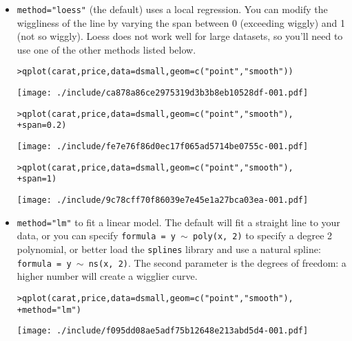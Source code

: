 \begin{itemize}
	\item {\tt method="loess"} (the default) uses a local regression.  You can modify the wiggliness of the line by varying the span between 0 (exceeding wiggly) and 1 (not so wiggly).  Loess does not work well for large datasets, so you'll need to use one of the other methods listed below.

\begin{alltt}
> qplot(carat, price, data = dsmall, geom = c("point", "smooth"))
\end{alltt}
\texttt{[image: ./include/ca878a86ce2975319d3b3b8eb10528df-001.pdf]}
\begin{alltt}

> qplot(carat, price, data = dsmall, geom = c("point", "smooth"), 
+     span = 0.2)
\end{alltt}
\texttt{[image: ./include/fe7e76f86d0ec17f065ad5714be0755c-001.pdf]}
\begin{alltt}

> qplot(carat, price, data = dsmall, geom = c("point", "smooth"), 
+     span = 1)
\end{alltt}
\texttt{[image: ./include/9c78cff70f86039e7e45e1a27bca03ea-001.pdf]}
\begin{alltt}

\end{alltt}

	\item {\tt method="lm"} to fit a linear model.  The default will fit a straight line to your data, or you can specify {\tt formula = y $\sim$ poly(x, 2)} to specify a degree 2 polynomial, or better load the {\tt splines} library and use a natural spline: {\tt formula = y $\sim$ ns(x, 2)}.  The second parameter is the degrees of freedom: a higher number will create a wigglier curve.

\begin{alltt}
> qplot(carat, price, data = dsmall, geom = c("point", "smooth"), 
+     method = "lm")
\end{alltt}
\texttt{[image: ./include/f095dd08ae5adf75b12648e213abd5d4-001.pdf]}
\begin{alltt}


\end{alltt}
\end{itemize}
